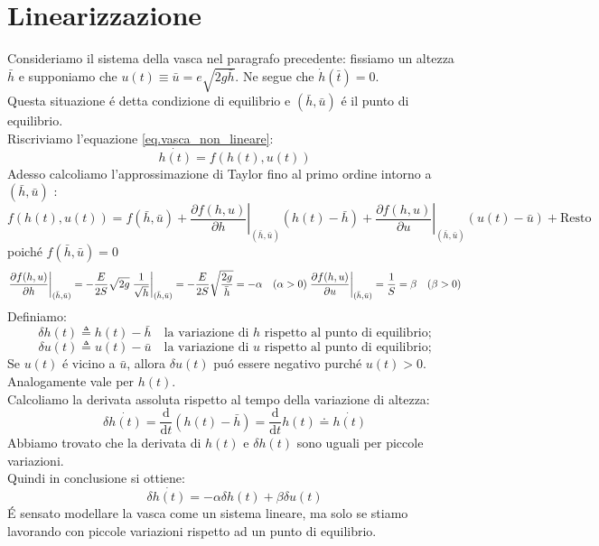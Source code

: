\documentclass[../main.tex]{subfiles}
\begin{document}
	\section{Linearizzazione}
		Consideriamo il sistema della vasca nel paragrafo precedente: fissiamo un altezza $ \bar{h} $ e supponiamo che $u(t) \equiv \bar{u} = e \sqrt{2g \bar{h}}$. Ne segue che $ \dot{h}(\bar{t}) =0 $.\\
		Questa situazione \'e detta condizione di equilibrio e $( \bar{h} , \bar{u}) $ \'e il punto di equilibrio.\\
		Riscriviamo l'equazione \ref{eq.vasca_non_lineare}:
		\[ \dot{h(t)} = f(h(t),u(t)) \]
		Adesso calcoliamo l'approssimazione di Taylor fino al primo ordine intorno a \( (\bar{h},\bar{u}) \) :
		\[
			f(h(t),u(t)) = f(\bar{h},\bar{u}) + \left. \frac{\partial f(h,u)}{\partial h} \right|_{(\bar{h},\bar{u})} (h(t) - \bar{h}) + \left. \frac{\partial f(h,u)}{\partial u} \right|_{(\bar{h},\bar{u})} (u(t) - \bar{u}) + \mbox{Resto}
		\]
		poich\'e $ f(\bar{h},\bar{u}) =0$\\
		\[
			\left. \frac{\partial f(h,u)}{\partial h} \right|_{(\bar{h},\bar{u})} = - \frac{E}{2S} \sqrt{2g} \left. \frac{1}{\sqrt{h}} \right|_{(\bar{h},\bar{u})} = - \frac{E}{2S} \sqrt{\frac{2g}{\bar{h}}} = - \alpha \quad (\alpha > 0)\\
			\left. \frac{\partial f(h,u)}{\partial u} \right|_{(\bar{h},\bar{u})} = \frac{1}{S} = \beta \quad (\beta > 0)  
		\]
		Definiamo:
		\[ \delta h(t) \triangleq h(t)- \bar{h} \quad \text{la variazione di $h$ rispetto al punto di equilibrio;} \]
		\[ \delta u(t) \triangleq u(t)- \bar{u} \quad \text{la variazione di $u$ rispetto al punto di equilibrio;} \]
		Se $u(t)$ \'e vicino a $\bar{u}$, allora $\delta u(t)$ pu\'o essere negativo purch\'e $u(t)>0$. Analogamente vale per $h(t)$.\\
		Calcoliamo la derivata assoluta rispetto al tempo della variazione di altezza:
		\[ \delta \dot{h(t)} = \frac{\mathrm{d}}{\mathrm{d} t}(h(t)-\bar{h}) = \frac{\mathrm{d}}{\mathrm{d} t}h(t) \doteq \dot{h(t)} \] 
		Abbiamo trovato che la derivata di $h(t)$ e $\delta h(t)$ sono uguali per piccole variazioni.\\
		Quindi in conclusione si ottiene:
		\begin{equation}
			\delta \dot{h(t)} = -\alpha \delta h(t) + \beta \delta u(t)
		\end{equation}
		\'E sensato modellare la vasca come un sistema lineare, ma solo se stiamo lavorando con piccole variazioni rispetto ad un punto di equilibrio.
\end{document}
